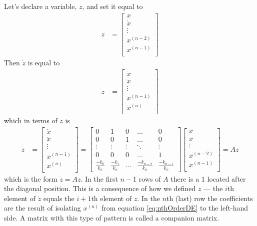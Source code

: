 \documentclass[11pt, oneside]{article}   	%
\begin{document}
Let's declare a variable, $z$, and set it equal to
\begin{align}
z &= \begin{bmatrix}
        x \\
        \dot{x} \\
        \vdots \\
        x^{(n-2)} \\
        x^{(n-1)} \\
      \end{bmatrix}
\end{align}
Then $\dot{z}$ is equal to
\begin{align}
\dot{z} &= \begin{bmatrix}
        \dot{x} \\
        \ddot{x} \\
        \vdots \\
        x^{(n-1)} \\
        x^{(n)} \\
      \end{bmatrix}
\end{align}
which in terms of $z$ is
\begin{align}
\dot{z} &= \begin{bmatrix}
        \dot{x} \\
        \ddot{x} \\
        \vdots \\
        x^{(n-1)} \\
        x^{(n)} \\
      \end{bmatrix}
  =
      \begin{bmatrix}
        0 & 1 & 0 & \dots & 0 \\
        0 & 0 & 1 & \dots & 0 \\
        \vdots & \vdots & \vdots & \ddots & \vdots \\
        0 & 0 & 0 & \dots & 1 \\
        \frac{-k_0}{k_n} & \frac{-k_1}{k_n} & \dots & \frac{-k_{n-2}}{k_n} & \frac{-k_{n-1}}{k_n}
      \end{bmatrix}
      \begin{bmatrix}
        x \\
        \dot{x} \\
        \vdots \\
        x^{(n-2)} \\
        x^{(n-1)} \\
      \end{bmatrix}
  = Az
\end{align}
which is the form $\dot{z} = Az$.
In the first $n-1$ rows of $A$ there is a $1$ located after the diagonal position.
This is a consequence of how we defined $z$ --- the $i$th element of $\dot{z}$ equals the $i+1$th element of $z$.
In the $n$th (last) row the coefficients are the result of isolating $x^{(n)}$ from equation \ref{eq:nthOrderDE} to the left-hand side.
A matrix with this type of pattern is called a companion matrix.
\end{document}

